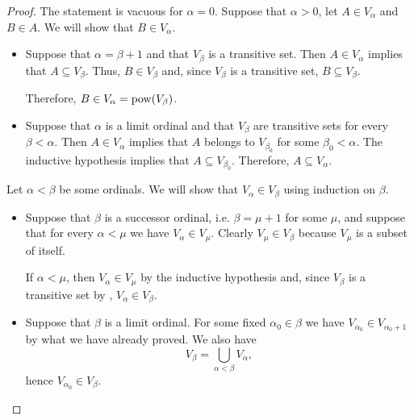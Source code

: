 \begin{proof}
   The statement is vacuous for \( \alpha = 0 \). Suppose that \( \alpha > 0 \), let \( A \in V_\alpha \) and \( B \in A \). We will show that \( B \in V_\alpha \).
  \begin{itemize}
    \item Suppose that \( \alpha = \beta + 1 \) and that \( V_\beta \) is a transitive set. Then \( A \in V_\alpha \) implies that \( A \subseteq V_\beta \). Thus, \( B \in V_\beta \) and, since \( V_\beta \) is a transitive set, \( B \subseteq V_\beta \).

    Therefore, \( B \in V_\alpha = \operatorname{pow}(V_\beta) \).

    \item Suppose that \( \alpha \) is a limit ordinal and that \( V_\beta \) are transitive sets for every \( \beta < \alpha \). Then \( A \in V_\alpha \) implies that \( A \) belongs to \( V_{\beta_0} \) for some \( \beta_0 < \alpha \). The inductive hypothesis implies that \( A \subseteq V_{\beta_0} \). Therefore, \( A \subseteq V_\alpha \).
  \end{itemize}

   Let \( \alpha < \beta \) be some ordinals. We will show that \( V_\alpha \in V_\beta \) using induction on \( \beta \).
  \begin{itemize}
    \item Suppose that \( \beta \) is a successor ordinal, i.e. \( \beta = \mu + 1 \) for some \( \mu \), and suppose that for every \( \alpha < \mu \) we have \( V_\alpha \in V_\mu \). Clearly \( V_\mu \in V_\beta \) because \( V_\mu \) is a subset of itself.

    If \( \alpha < \mu \), then \( V_\alpha \in V_\mu \) by the inductive hypothesis and, since \( V_\beta \) is a transitive set by , \( V_\alpha \in V_\beta \).

    \item Suppose that \( \beta \) is a limit ordinal. For some fixed \( \alpha_0 \in \beta \) we have \( V_{\alpha_0} \in V_{\alpha_0 + 1} \) by what we have already proved. We also have
    \begin{equation*}
      V_\beta
      =
      \bigcup_{\alpha < \beta} V_\alpha,
    \end{equation*}
    hence \( V_{\alpha_0} \in V_\beta \).
  \end{itemize}


\end{proof}
